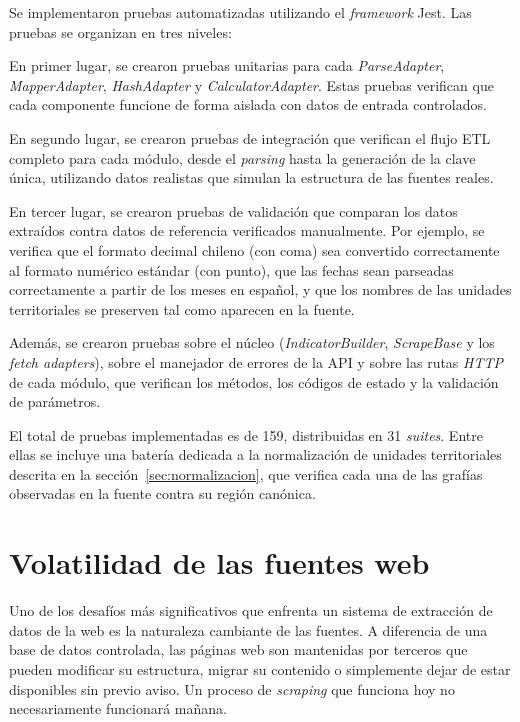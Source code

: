 \documentclass[12pt,letterpaper,oneside]{report}
\begin{document}
Se implementaron pruebas automatizadas utilizando el \textit{framework} Jest. Las pruebas se organizan en tres niveles:

En primer lugar, se crearon pruebas unitarias para cada \textit{ParseAdapter}, \textit{MapperAdapter}, \textit{HashAdapter} y \textit{CalculatorAdapter}. Estas pruebas verifican que cada componente funcione de forma aislada con datos de entrada controlados.

En segundo lugar, se crearon pruebas de integraci\'on que verifican el flujo ETL completo para cada m\'odulo, desde el \textit{parsing} hasta la generaci\'on de la clave \'unica, utilizando datos realistas que simulan la estructura de las fuentes reales.

En tercer lugar, se crearon pruebas de validaci\'on que comparan los datos extra\'idos contra datos de referencia verificados manualmente. Por ejemplo, se verifica que el formato decimal chileno (con coma) sea convertido correctamente al formato num\'erico est\'andar (con punto), que las fechas sean parseadas correctamente a partir de los meses en espa\~nol, y que los nombres de las unidades territoriales se preserven tal como aparecen en la fuente.

Adem\'as, se crearon pruebas sobre el n\'ucleo (\textit{IndicatorBuilder}, \textit{ScrapeBase} y los \textit{fetch adapters}), sobre el manejador de errores de la API y sobre las rutas \textit{HTTP} de cada m\'odulo, que verifican los m\'etodos, los c\'odigos de estado y la validaci\'on de par\'ametros.

El total de pruebas implementadas es de 159, distribuidas en 31 \textit{suites}. Entre ellas se incluye una bater\'ia dedicada a la normalizaci\'on de unidades territoriales descrita en la secci\'on~\ref{sec:normalizacion}, que verifica cada una de las graf\'ias observadas en la fuente contra su regi\'on can\'onica.

\section{Volatilidad de las fuentes web}
\label{sec:volatilidad}

Uno de los desaf\'ios m\'as significativos que enfrenta un sistema de extracci\'on de datos de la web es la naturaleza cambiante de las fuentes. A diferencia de una base de datos controlada, las p\'aginas web son mantenidas por terceros que pueden modificar su estructura, migrar su contenido o simplemente dejar de estar disponibles sin previo aviso. Un proceso de \textit{scraping} que funciona hoy no necesariamente funcionar\'a ma\~nana.
\end{document}
